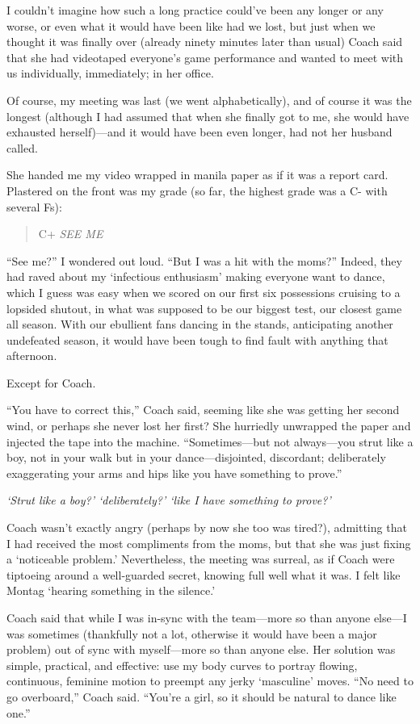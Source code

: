 I couldn't imagine how such a long practice could've been any longer or
any worse, or even what it would have been like had we lost, but just
when we thought it was finally over (already ninety minutes later than
usual) Coach said that she had videotaped everyone's game performance
and wanted to meet with us individually, immediately; in her office.

Of course, my meeting was last (we went alphabetically), and of course
it was the longest (although I had assumed that when she finally got to
me, she would have exhausted herself)---and it would have been even
longer, had not her husband called.

She handed me my video wrapped in manila paper as if it was a report
card. Plastered on the front was my grade (so far, the highest grade was
a C- with several Fs):

\begin{quote}
C+ \emph{SEE ME}
\end{quote}

``See me?'' I wondered out loud. ``But I was a hit with the moms?''
Indeed, they had raved about my `infectious enthusiasm' making everyone
want to dance, which I guess was easy when we scored on our first six
possessions cruising to a lopsided shutout, in what was supposed to be
our biggest test, our closest game all season. With our ebullient fans
dancing in the stands, anticipating another undefeated season, it would
have been tough to find fault with anything that afternoon.

Except for Coach.

``You have to correct this,'' Coach said, seeming like she was getting
her second wind, or perhaps she never lost her first? She hurriedly
unwrapped the paper and injected the tape into the machine.
``Sometimes---but not always---you strut like a boy, not in your walk
but in your dance---disjointed, discordant; deliberately exaggerating
your arms and hips like you have something to prove.''

\emph{`Strut like a boy?' `deliberately?' `like I have something to
prove?'}

Coach wasn't exactly angry (perhaps by now she too was tired?),
admitting that I had received the most compliments from the moms, but
that she was just fixing a `noticeable problem.' Nevertheless, the
meeting was surreal, as if Coach were tiptoeing around a well-guarded
secret, knowing full well what it was. I felt like Montag `hearing
something in the silence.'

Coach said that while I was in-sync with the team---more so than anyone
else---I was sometimes (thankfully not a lot, otherwise it would have
been a major problem) out of sync with myself---more so than anyone
else. Her solution was simple, practical, and effective: use my body
curves to portray flowing, continuous, feminine motion to preempt any
jerky `masculine' moves. ``No need to go overboard,'' Coach said.
``You're a girl, so it should be natural to dance like one.''

